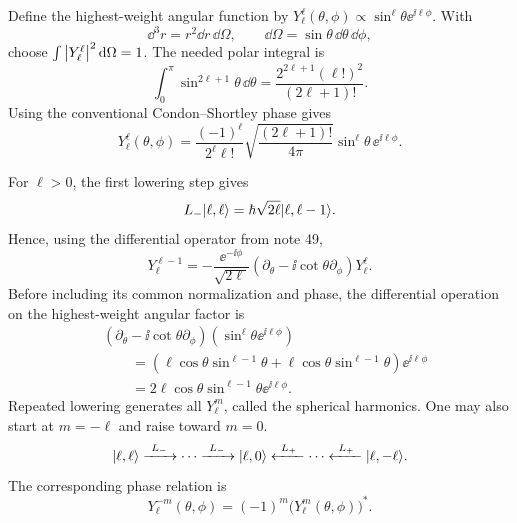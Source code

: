 Define the highest-weight angular function by
$Y_\ell^\ell(\theta,\phi)\propto\sin^\ell\theta\ee^{\ii\ell\phi}$.
With
\[
 \dd^3r=r^2\dd r\,\dd\Omega,\qquad
 \dd\Omega=\sin\theta\,\dd\theta\,\dd\phi,
\]
choose $\int\left\lvert Y_\ell^\ell\right\rvert^2\mathop{}\!\mathrm{d}\Omega=1$.
The needed polar integral is
\[
 \int_0^\pi\sin^{2\ell+1}\theta\,\dd\theta
 =\frac{2^{2\ell+1}(\ell!)^2}{(2\ell+1)!}.
\]
Using the conventional Condon--Shortley phase gives
\[
 \boxed{Y_\ell^\ell(\theta,\phi)
 =\frac{(-1)^\ell}{2^\ell\ell!}
   \sqrt{\frac{(2\ell+1)!}{4\pi}}
   \sin^\ell\theta\,\ee^{\ii\ell\phi}.}
\]

For $\ell>0$, the first lowering step gives
\[
 L_-\lvert \ell,\ell\rangle=\hbar\sqrt{2\ell}\lvert \ell,\ell-1\rangle.
\]
Hence, using the differential operator from note 49,
\[
 Y_\ell^{\ell-1}
 =-\frac{\ee^{-\ii\phi}}{\sqrt{2\ell}}
   \left(\partial_\theta-\ii\cot\theta\partial_\phi\right)
   Y_\ell^\ell.
\]
Before including its common normalization and phase, the differential
operation on the highest-weight angular factor is
\begin{align*}
 &\left(\partial_\theta-\ii\cot\theta\partial_\phi\right)
   \left(\sin^\ell\theta\ee^{\ii\ell\phi}\right)\\
 &\qquad=\left(\ell\cos\theta\sin^{\ell-1}\theta
       +\ell\cos\theta\sin^{\ell-1}\theta\right)\ee^{\ii\ell\phi}\\
 &\qquad=2\ell\cos\theta\sin^{\ell-1}\theta\ee^{\ii\ell\phi}.
\end{align*}
Repeated lowering generates all $Y_\ell^m$, called the spherical
harmonics. One may also start at $m=-\ell$ and raise toward $m=0$.
\[
 \lvert \ell,\ell\rangle\xrightarrow{\ L_-\ }\cdots
 \xrightarrow{\ L_-\ }\lvert \ell,0\rangle
 \xleftarrow{\ L_+\ }\cdots\xleftarrow{\ L_+\ }\lvert \ell,-\ell\rangle.
\]
The corresponding phase relation is
\[
 \boxed{Y_\ell^{-m}(\theta,\phi)=(-1)^m
   \bigl(Y_\ell^m(\theta,\phi)\bigr)^*.}
\]
